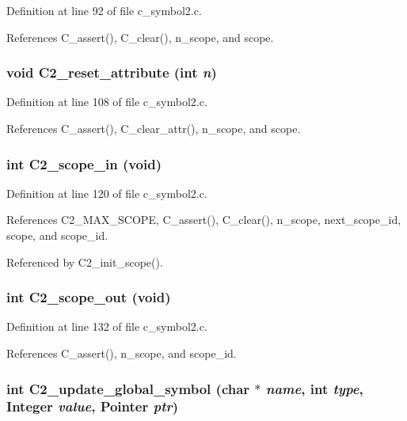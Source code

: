Definition at line 92 of file c\_\-symbol2.c.

References C\_\-assert(), C\_\-clear(), n\_\-scope, and scope.
\subsubsection{\setlength{\rightskip}{0pt plus 5cm}void C2\_\-reset\_\-attribute (int {\em n})}\label{c__symbol2_8c_8c94fb1ba2c62810210aeef02ef1f592}




Definition at line 108 of file c\_\-symbol2.c.

References C\_\-assert(), C\_\-clear\_\-attr(), n\_\-scope, and scope.
\subsubsection{\setlength{\rightskip}{0pt plus 5cm}int C2\_\-scope\_\-in (void)}\label{c__symbol2_8c_20ad889671b058864ad8e956c0fc3756}




Definition at line 120 of file c\_\-symbol2.c.

References C2\_\-MAX\_\-SCOPE, C\_\-assert(), C\_\-clear(), n\_\-scope, next\_\-scope\_\-id, scope, and scope\_\-id.

Referenced by C2\_\-init\_\-scope().
\subsubsection{\setlength{\rightskip}{0pt plus 5cm}int C2\_\-scope\_\-out (void)}\label{c__symbol2_8c_6cbd045e663b5f63f8b6f1d85c62be29}




Definition at line 132 of file c\_\-symbol2.c.

References C\_\-assert(), n\_\-scope, and scope\_\-id.
\subsubsection{\setlength{\rightskip}{0pt plus 5cm}int C2\_\-update\_\-global\_\-symbol (char $\ast$ {\em name}, int {\em type}, \bf{Integer} {\em value}, \bf{Pointer} {\em ptr})}\label{c__symbol2_8c_04bb4acda6b91a41201e83899a8c226a}




